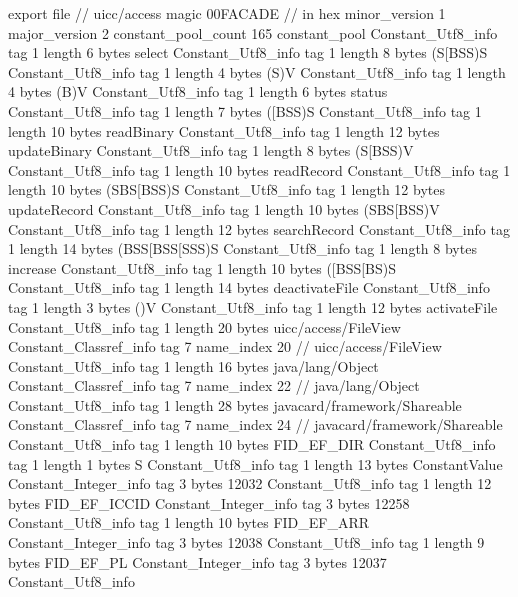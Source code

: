export file {		// uicc/access
	magic	00FACADE		 // in hex
	minor_version	1
	major_version	2
	constant_pool_count	165
	constant_pool {
		Constant_Utf8_info {
			tag	1
			length	6
			bytes	select
		}
		Constant_Utf8_info {
			tag	1
			length	8
			bytes	(S[BSS)S
		}
		Constant_Utf8_info {
			tag	1
			length	4
			bytes	(S)V
		}
		Constant_Utf8_info {
			tag	1
			length	4
			bytes	(B)V
		}
		Constant_Utf8_info {
			tag	1
			length	6
			bytes	status
		}
		Constant_Utf8_info {
			tag	1
			length	7
			bytes	([BSS)S
		}
		Constant_Utf8_info {
			tag	1
			length	10
			bytes	readBinary
		}
		Constant_Utf8_info {
			tag	1
			length	12
			bytes	updateBinary
		}
		Constant_Utf8_info {
			tag	1
			length	8
			bytes	(S[BSS)V
		}
		Constant_Utf8_info {
			tag	1
			length	10
			bytes	readRecord
		}
		Constant_Utf8_info {
			tag	1
			length	10
			bytes	(SBS[BSS)S
		}
		Constant_Utf8_info {
			tag	1
			length	12
			bytes	updateRecord
		}
		Constant_Utf8_info {
			tag	1
			length	10
			bytes	(SBS[BSS)V
		}
		Constant_Utf8_info {
			tag	1
			length	12
			bytes	searchRecord
		}
		Constant_Utf8_info {
			tag	1
			length	14
			bytes	(BSS[BSS[SSS)S
		}
		Constant_Utf8_info {
			tag	1
			length	8
			bytes	increase
		}
		Constant_Utf8_info {
			tag	1
			length	10
			bytes	([BSS[BS)S
		}
		Constant_Utf8_info {
			tag	1
			length	14
			bytes	deactivateFile
		}
		Constant_Utf8_info {
			tag	1
			length	3
			bytes	()V
		}
		Constant_Utf8_info {
			tag	1
			length	12
			bytes	activateFile
		}
		Constant_Utf8_info {
			tag	1
			length	20
			bytes	uicc/access/FileView
		}
		Constant_Classref_info {
			tag	7
			name_index	20		// uicc/access/FileView
		}
		Constant_Utf8_info {
			tag	1
			length	16
			bytes	java/lang/Object
		}
		Constant_Classref_info {
			tag	7
			name_index	22		// java/lang/Object
		}
		Constant_Utf8_info {
			tag	1
			length	28
			bytes	javacard/framework/Shareable
		}
		Constant_Classref_info {
			tag	7
			name_index	24		// javacard/framework/Shareable
		}
		Constant_Utf8_info {
			tag	1
			length	10
			bytes	FID_EF_DIR
		}
		Constant_Utf8_info {
			tag	1
			length	1
			bytes	S
		}
		Constant_Utf8_info {
			tag	1
			length	13
			bytes	ConstantValue
		}
		Constant_Integer_info {
			tag	3
			bytes	12032
		}
		Constant_Utf8_info {
			tag	1
			length	12
			bytes	FID_EF_ICCID
		}
		Constant_Integer_info {
			tag	3
			bytes	12258
		}
		Constant_Utf8_info {
			tag	1
			length	10
			bytes	FID_EF_ARR
		}
		Constant_Integer_info {
			tag	3
			bytes	12038
		}
		Constant_Utf8_info {
			tag	1
			length	9
			bytes	FID_EF_PL
		}
		Constant_Integer_info {
			tag	3
			bytes	12037
		}
		Constant_Utf8_info {
}}}
